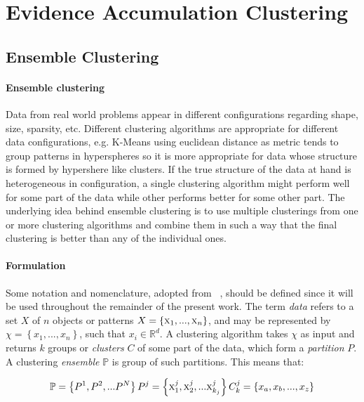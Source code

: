 \section{Evidence Accumulation Clustering}


\subsection{Ensemble Clustering}
\label{sec:eac}

\paragraph{Ensemble clustering}
Data from real world problems appear in different configurations regarding shape, size, sparsity, etc. %
Different clustering algorithms are appropriate for different data configurations, e.g. K-Means using euclidean distance as metric tends to group patterns in hyperspheres so it is more appropriate for data whose structure is formed by hypershere like clusters.%
If the true structure of the data at hand is heterogeneous in configuration, a single clustering algorithm might perform well for some part of the data while other performs better for some other part. The underlying idea behind ensemble clustering is to use multiple clusterings from one or more clustering algorithms and combine them in such a way that the final clustering is better than any of the individual ones.

\paragraph{Formulation}
Some notation and nomenclature, adopted from ~\cite{Fred2005}, should be defined since it will be used throughout the remainder of the present work. The term \emph{data} refers to a set $X$ of $n$ objects or patterns $X=\left \{ \textsc{x}_1,...,\textsc{x}_n \right \}$, and may be represented by $\chi = \left \{ x_1,...,x_n \right \}$, such that $x_i \in  \mathbb{R}^d$. A clustering algorithm takes $\chi$ as input and returns $k$ groups or \emph{clusters} $C$ of some part of the data, which form a \emph{partition} $P$. A clustering \emph{ensemble} $\mathbb{P}$ is group of such partitions. This means that:

$$
\mathbb{P} = \left \{   P^1, P^2, ... P^N   \right \} \\
P^j = \left \{   \textsc{x}^j_1, \textsc{x}^j_2, ... \textsc{x}^{j}_{k_j}   \right \} \\
C^j_k = \left \{   x_a, x_b, ..., x_z   \right \}
$$

